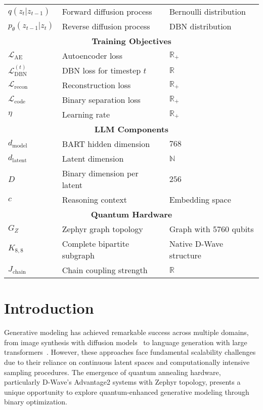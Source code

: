 \documentclass{article}
\begin{document}
\begin{table}[H]
\begin{tabular}{|l|l|l|}
$q(z_t|z_{t-1})$ & Forward diffusion process & Bernoulli distribution \\
$p_\theta(z_{t-1}|z_t)$ & Reverse diffusion process & DBN distribution \\
\hline
\multicolumn{3}{|c|}{\textbf{Training Objectives}} \\
\hline
$\mathcal{L}_{\text{AE}}$ & Autoencoder loss & $\mathbb{R}_+$ \\
$\mathcal{L}_{\text{DBN}}^{(t)}$ & DBN loss for timestep $t$ & $\mathbb{R}$ \\
$\mathcal{L}_{\text{recon}}$ & Reconstruction loss & $\mathbb{R}_+$ \\
$\mathcal{L}_{\text{code}}$ & Binary separation loss & $\mathbb{R}_+$ \\
$\eta$ & Learning rate & $\mathbb{R}_+$ \\
\hline
\multicolumn{3}{|c|}{\textbf{LLM Components}} \\
\hline
$d_{\text{model}}$ & BART hidden dimension & $768$ \\
$d_{\text{latent}}$ & Latent dimension & $\mathbb{N}$ \\
$D$ & Binary dimension per latent & $256$ \\
$c$ & Reasoning context & Embedding space \\
\hline
\multicolumn{3}{|c|}{\textbf{Quantum Hardware}} \\
\hline
$G_Z$ & Zephyr graph topology & Graph with 5760 qubits \\
$K_{8,8}$ & Complete bipartite subgraph & Native D-Wave structure \\
$J_{\text{chain}}$ & Chain coupling strength & $\mathbb{R}$ \\
\hline
\end{tabular}
\end{table}

\section{Introduction}

Generative modeling has achieved remarkable success across multiple domains, from image synthesis with diffusion models~\cite{ho2020denoising} to language generation with large transformers~\cite{brown2020language}. However, these approaches face fundamental scalability challenges due to their reliance on continuous latent spaces and computationally intensive sampling procedures. The emergence of quantum annealing hardware, particularly D-Wave's Advantage2 systems with Zephyr topology, presents a unique opportunity to explore quantum-enhanced generative modeling through binary optimization.
\end{document}
